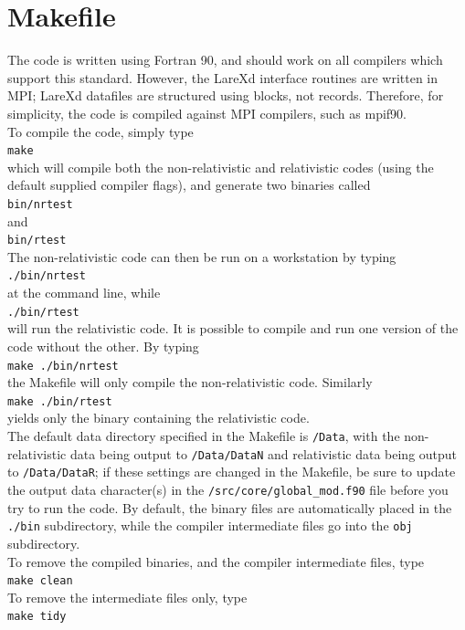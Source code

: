 \documentclass[a4paper,11pt,usenames,dvipsnames]{article}
\begin{document}
\section{Makefile}\label{sec:Makefile}
The code is written using Fortran 90, and should work on all compilers which support this standard. However, the LareXd interface routines are written in MPI; LareXd datafiles are structured using blocks, not records. Therefore, for simplicity, the code is compiled against MPI compilers, such as mpif90.\\
To compile the code, simply type\\
\texttt{make}\\
which will compile both the non-relativistic and relativistic codes (using the default supplied compiler flags), and generate two binaries called\\
\texttt{bin/nrtest}\\
and\\
\texttt{bin/rtest}\\
The non-relativistic code can then be run on a workstation by typing\\
\texttt{./bin/nrtest}\\
at the command line, while\\
\texttt{./bin/rtest}\\
will run the relativistic code. It is possible to compile and run one version of the code without the other. By typing\\
\texttt{make ./bin/nrtest}\\
the Makefile will only compile the non-relativistic code. Similarly\\
\texttt{make ./bin/rtest}\\
yields only the binary containing the relativistic code.\\
The default data directory specified in the Makefile is \texttt{/Data}, with the non-relativistic data being output to \texttt{/Data/DataN} and relativistic data being output to \texttt{/Data/DataR}; if these settings are changed in the Makefile, be sure to update the output data character(s) in the \texttt{/src/core/global\_mod.f90} file before you try to run the code. By default, the binary files are automatically placed in the \texttt{./bin} subdirectory, while the compiler intermediate files go into the \texttt{obj} subdirectory.\\ 
\noindent To remove the compiled binaries, and the compiler intermediate files, type\\
\texttt{make clean}\\
\noindent To remove the intermediate files only, type\\
\texttt{make tidy}
\end{document}
